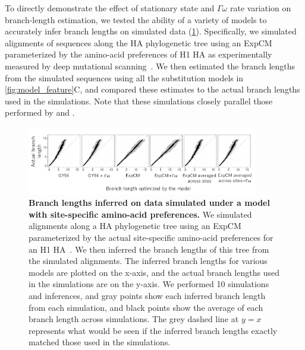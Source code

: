 \documentclass[11pt]{article}
\begin{document}
To directly demonstrate the effect of stationary state and $\Gamma\omega$ rate variation on branch-length estimation, we tested the ability of a variety of models to accurately infer branch lengths on simulated data (\ref{fig:simulations}).
Specifically, we simulated alignments of sequences along the HA phylogenetic tree using an ExpCM parameterized by the amino-acid preferences of H1 HA as experimentally measured by deep mutational scanning~\citep{doud2016accurate}. We then estimated the branch lengths from the simulated sequences using all the substitution models in \ref{fig:model_feature}C, and compared these estimates to the actual branch lengths used in the simulations.
Note that these simulations closely parallel those performed by \citet{halpern1998evolutionary} and \citet{wertheim2011purifying}.

\begin{figure}
\centerline{\includegraphics[width=0.9\textwidth]{figures/simulations}}
\caption{\label{fig:simulations}
\textbf{Branch lengths inferred on data simulated under a model with site-specific amino-acid preferences.} 
We simulated alignments along a HA phylogenetic tree using an ExpCM parameterized by the actual site-specific amino-acid preferences for an H1 HA~\citep{doud2016accurate}.
We then inferred the branch lengths of this tree from the simulated alignments.
The inferred branch lengths for various models are plotted on the x-axis, and the actual branch lengths used in the simulations are on the y-axis.
We performed 10 simulations and inferences, and gray points show each inferred branch length from each simulation, and black points show the average of each branch length across simulations.
The grey dashed line at $y=x$ represents what would be seen if the inferred branch lengths exactly matched those used in the simulations. 
}
\end{figure}
\end{document}
